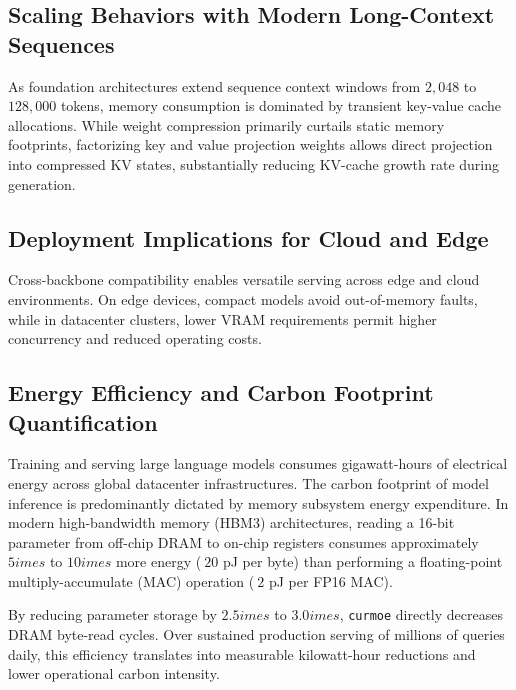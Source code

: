 \subsection{Scaling Behaviors with Modern Long-Context Sequences}
As foundation architectures extend sequence context windows from $2{,}048$ to $128{,}000$ tokens, memory consumption is dominated by transient key-value cache allocations. While weight compression primarily curtails static memory footprints, factorizing key and value projection weights allows direct projection into compressed KV states, substantially reducing KV-cache growth rate during generation.

\subsection{Deployment Implications for Cloud and Edge}
Cross-backbone compatibility enables versatile serving across edge and cloud environments. On edge devices, compact models avoid out-of-memory faults, while in datacenter clusters, lower VRAM requirements permit higher concurrency and reduced operating costs.

\subsection{Energy Efficiency and Carbon Footprint Quantification}
Training and serving large language models consumes gigawatt-hours of electrical energy across global datacenter infrastructures. The carbon footprint of model inference is predominantly dictated by memory subsystem energy expenditure. In modern high-bandwidth memory (HBM3) architectures, reading a 16-bit parameter from off-chip DRAM to on-chip registers consumes approximately $5	imes$ to $10	imes$ more energy ($~20$ pJ per byte) than performing a floating-point multiply-accumulate (MAC) operation ($~2$ pJ per FP16 MAC).

By reducing parameter storage by $2.5	imes$ to $3.0	imes$, \texttt{curmoe} directly decreases DRAM byte-read cycles. Over sustained production serving of millions of queries daily, this efficiency translates into measurable kilowatt-hour reductions and lower operational carbon intensity.
